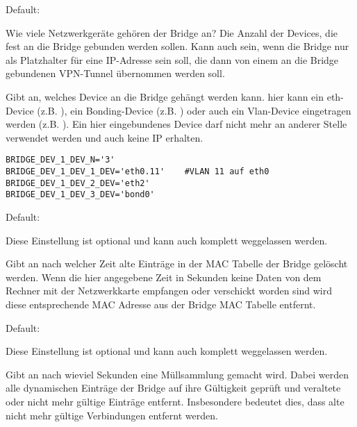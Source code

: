 \begin{description}

  Default: 

  Wie viele Netzwerkgeräte gehören der Bridge an? Die Anzahl der
  Devices, die fest an die Bridge gebunden werden sollen. Kann auch
   sein, wenn die Bridge nur als Platzhalter für eine
  IP-Adresse sein soll, die dann von einem an die Bridge gebundenen
  VPN-Tunnel übernommen werden soll.


  Gibt an, welches Device an die Bridge gehängt werden kann.
  hier kann ein eth-Device (z.B. ), ein Bonding-Device
  (z.B. ) oder auch ein Vlan-Device eingetragen werden
  (z.B. ).
  Ein hier eingebundenes Device darf nicht mehr an anderer Stelle
  verwendet werden und auch keine IP erhalten.

\begin{example}
\begin{verbatim}
BRIDGE_DEV_1_DEV_N='3'
BRIDGE_DEV_1_DEV_1_DEV='eth0.11'	#VLAN 11 auf eth0
BRIDGE_DEV_1_DEV_2_DEV='eth2'
BRIDGE_DEV_1_DEV_3_DEV='bond0'
\end{verbatim}
\end{example}


  Default: 

  Diese Einstellung ist optional und kann auch komplett weggelassen
  werden.

  Gibt an nach welcher Zeit alte Einträge in der MAC Tabelle der
  Bridge gelöscht werden. Wenn die hier angegebene Zeit in Sekunden
  keine Daten von dem Rechner mit der Netzwerkkarte empfangen oder
  verschickt worden sind wird diese entsprechende MAC Adresse aus der
  Bridge MAC Tabelle entfernt.


  Default: 
 
  Diese Einstellung ist optional und kann auch komplett weggelassen
  werden.

  Gibt an nach wieviel Sekunden eine \glqq{}Müllsammlung\grqq{}
  gemacht wird. Dabei werden alle dynamischen Einträge der Bridge auf
  ihre Gültigkeit geprüft und veraltete oder nicht mehr gültige
  Einträge entfernt. Insbesondere bedeutet dies, dass alte nicht mehr
  gültige Verbindungen entfernt werden.


\end{description}

